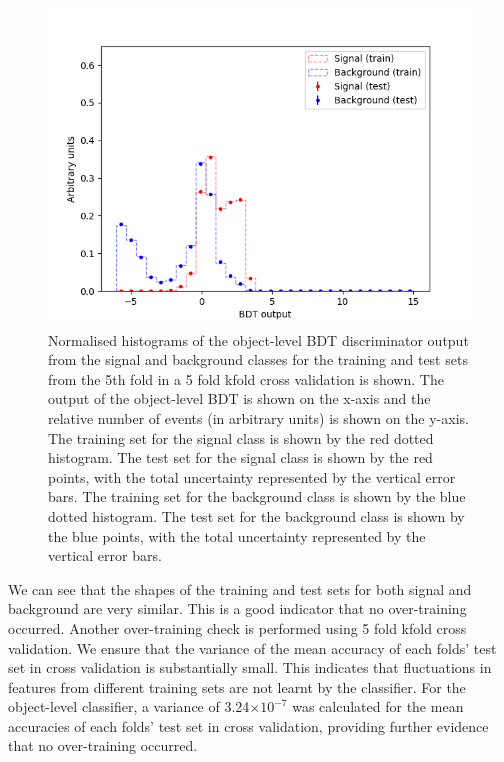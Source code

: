\begin{figure}[h!]
	\includegraphics[scale=0.8]{figures/overtrainingCheck_4lep_lb.png}
	\centering
	\caption{Normalised histograms of the object-level BDT discriminator output from the signal and background classes for the training and test sets from the 5th fold in a 5 fold kfold cross validation is shown. The output of the object-level BDT is shown on the x-axis and the relative number of events (in arbitrary units) is shown on the y-axis. The training set for the signal class is shown by the red dotted histogram. The test set for the signal class is shown by the red points, with the total uncertainty represented by the vertical error bars. The training set for the background class is shown by the blue dotted histogram. The test set for the background class is shown by the blue points, with the total uncertainty represented by the vertical error bars.}
	\label{fig:object-bdt-overtrain-check}
\end{figure}

We can see that the shapes of the training and test sets for both signal and background are very similar. This is a good indicator that no over-training occurred. Another over-training check is performed using 5 fold kfold cross validation. We ensure that the variance of the mean accuracy of each folds' test set in cross validation is substantially small. This indicates that fluctuations in features from different training sets are not learnt by the classifier. For the object-level classifier, a variance of 3.24$\times 10^{-7}$ was calculated for the mean accuracies of each folds' test set in cross validation, providing further evidence that no over-training occurred. \\\\

